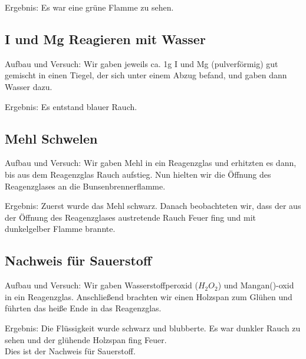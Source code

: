 Ergebnis: Es war eine grüne Flamme zu sehen.
\subsection{\acf{I} und \acf{Mg} Reagieren mit Wasser}
Aufbau und Versuch: Wir gaben jeweils ca. 1g \acf{I} und \acf{Mg} (pulverförmig) gut gemischt in einen
Tiegel, der sich
unter einem Abzug befand, und gaben dann Wasser dazu.

Ergebnis: Es entstand blauer Rauch.
\subsection{Mehl Schwelen}
Aufbau und Versuch: Wir gaben Mehl in ein Reagenzglas und erhitzten es dann, bis aus dem Reagenzglas
Rauch aufstieg. Nun
hielten wir die Öffnung des Reagenzglases an die Bunsenbrennerflamme.

Ergebnis: Zuerst wurde das Mehl schwarz. Danach beobachteten wir, dass der aus der Öffnung des Reagenzglases austretende
Rauch Feuer fing und mit dunkelgelber Flamme brannte.
\subsection{Nachweis für Sauerstoff}
Aufbau und Versuch: Wir gaben Wasserstoffperoxid ($H_2O_2$) und Mangan()-oxid in ein Reagenzglas.
Anschließend
brachten wir einen Holzspan zum Glühen und führten das heiße Ende in das Reagenzglas.

Ergebnis: Die Flüssigkeit wurde schwarz und blubberte. Es war dunkler Rauch zu sehen und der glühende Holzspan fing
Feuer.\\
Dies ist der Nachweis für Sauerstoff.